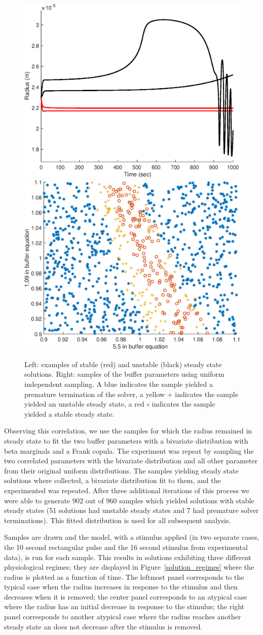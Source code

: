 \begin{figure}[h]
\centering
\includegraphics[width=.4 \textwidth]{Figures/Steady_State_Curves.eps}
\includegraphics[width=.4 \textwidth]{Figures/First_Iteration_Samples.eps}
\caption{Left: examples of stable (red) and unstable (black) steady state solutions. Right: samples of the buffer parameters using uniform independent sampling. A blue \* indicates the sample yielded a premature termination of the solver, a yellow + indicates the sample yielded an unstable steady state, a red $\circ$ indicates the sample yielded a stable steady state.}
\label{steady_states}
\end{figure}

Observing this correlation, we use the samples for which the radius remained in steady state to fit the two buffer parameters with a bivariate distribution with beta marginals and a Frank copula. The experiment was repeat by sampling the two correlated parameters with the bivariate distribution and all other parameter from their original uniform distributions. The samples yielding steady state solutions where collected, a bivariate distribution fit to them, and the experimented was repeated. After three additional iterations of this process we were able to generate 902 out of 960 samples which yielded solutions with stable steady states (51 solutions had unstable steady states and 7 had premature solver terminations). This fitted distribution is used for all subsequent analysis. 

Samples are drawn and the model, with a stimulus applied (in two separate cases, the 10 second rectangular pulse and the 16 second stimulus from experimental data), is run for each sample. This results in solutions exhibiting three different physiological regimes; they are displayed in Figure~\ref{solution_regimes} where the radius is plotted as a function of time. The leftmost panel corresponds to the typical case when the radius increases in response to the stimulus and then decreases when it is removed; the center panel corresponds to an atypical case where the radius has an initial decrease in response to the stimulus; the right panel corresponds to another atypical case where the radius reaches another steady state an does not decrease after the stimulus is removed.

